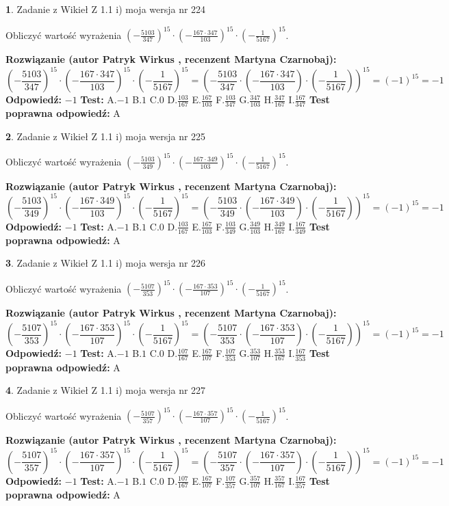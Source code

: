\documentclass[12pt, a4paper]{article}
\theoremstyle{definition} %
\newtheorem{zad}{}
\newcommand{\zadStart}[1]{\begin{zad}#1\newline}
\newcommand{\zadStop}{\end{zad}}
\newcommand{\rozwStart}[2]{\noindent \textbf{Rozwiązanie (autor #1 , recenzent #2): }\newline}
\newcommand{\rozwStop}{\newline}
\newcommand{\odpStart}{\noindent \textbf{Odpowiedź:}\newline}
\newcommand{\odpStop}{\newline}
\newcommand{\testStart}{\noindent \textbf{Test:}\newline}
\newcommand{\testStop}{\newline}
\newcommand{\kluczStart}{\noindent \textbf{Test poprawna odpowiedź:}\newline}
\newcommand{\kluczStop}{\newline}
\begin{document}
\zadStart{Zadanie z Wikieł Z 1.1 i) moja wersja nr 224}

Obliczyć wartość wyrażenia $(-\frac{5103}{347})^{15} \cdot (-\frac{167 \cdot 347}{103})^{15} \cdot (-\frac{1}{5167})^{15}$.
\zadStop
\rozwStart{Patryk Wirkus}{Martyna Czarnobaj}
$$(-\frac{5103}{347})^{15} \cdot (-\frac{167 \cdot 347}{103})^{15} \cdot (-\frac{1}{5167})^{15} = (-\frac{5103}{347} \cdot (-\frac{167 \cdot 347}{103}) \cdot (-\frac{1}{5167}))^{15} = (-1)^{15} = -1$$
\rozwStop
\odpStart
$-1$
\odpStop
\testStart
A.$-1$ B.$1$ C.$0$ D.$\frac{103}{167}$ E.$\frac{167}{103}$
F.$\frac{103}{347}$ G.$\frac{347}{103}$
H.$\frac{347}{167}$
I.$\frac{167}{347}$
\testStop
\kluczStart
A
\kluczStop



\zadStart{Zadanie z Wikieł Z 1.1 i) moja wersja nr 225}

Obliczyć wartość wyrażenia $(-\frac{5103}{349})^{15} \cdot (-\frac{167 \cdot 349}{103})^{15} \cdot (-\frac{1}{5167})^{15}$.
\zadStop
\rozwStart{Patryk Wirkus}{Martyna Czarnobaj}
$$(-\frac{5103}{349})^{15} \cdot (-\frac{167 \cdot 349}{103})^{15} \cdot (-\frac{1}{5167})^{15} = (-\frac{5103}{349} \cdot (-\frac{167 \cdot 349}{103}) \cdot (-\frac{1}{5167}))^{15} = (-1)^{15} = -1$$
\rozwStop
\odpStart
$-1$
\odpStop
\testStart
A.$-1$ B.$1$ C.$0$ D.$\frac{103}{167}$ E.$\frac{167}{103}$
F.$\frac{103}{349}$ G.$\frac{349}{103}$
H.$\frac{349}{167}$
I.$\frac{167}{349}$
\testStop
\kluczStart
A
\kluczStop



\zadStart{Zadanie z Wikieł Z 1.1 i) moja wersja nr 226}

Obliczyć wartość wyrażenia $(-\frac{5107}{353})^{15} \cdot (-\frac{167 \cdot 353}{107})^{15} \cdot (-\frac{1}{5167})^{15}$.
\zadStop
\rozwStart{Patryk Wirkus}{Martyna Czarnobaj}
$$(-\frac{5107}{353})^{15} \cdot (-\frac{167 \cdot 353}{107})^{15} \cdot (-\frac{1}{5167})^{15} = (-\frac{5107}{353} \cdot (-\frac{167 \cdot 353}{107}) \cdot (-\frac{1}{5167}))^{15} = (-1)^{15} = -1$$
\rozwStop
\odpStart
$-1$
\odpStop
\testStart
A.$-1$ B.$1$ C.$0$ D.$\frac{107}{167}$ E.$\frac{167}{107}$
F.$\frac{107}{353}$ G.$\frac{353}{107}$
H.$\frac{353}{167}$
I.$\frac{167}{353}$
\testStop
\kluczStart
A
\kluczStop



\zadStart{Zadanie z Wikieł Z 1.1 i) moja wersja nr 227}

Obliczyć wartość wyrażenia $(-\frac{5107}{357})^{15} \cdot (-\frac{167 \cdot 357}{107})^{15} \cdot (-\frac{1}{5167})^{15}$.
\zadStop
\rozwStart{Patryk Wirkus}{Martyna Czarnobaj}
$$(-\frac{5107}{357})^{15} \cdot (-\frac{167 \cdot 357}{107})^{15} \cdot (-\frac{1}{5167})^{15} = (-\frac{5107}{357} \cdot (-\frac{167 \cdot 357}{107}) \cdot (-\frac{1}{5167}))^{15} = (-1)^{15} = -1$$
\rozwStop
\odpStart
$-1$
\odpStop
\testStart
A.$-1$ B.$1$ C.$0$ D.$\frac{107}{167}$ E.$\frac{167}{107}$
F.$\frac{107}{357}$ G.$\frac{357}{107}$
H.$\frac{357}{167}$
I.$\frac{167}{357}$
\testStop
\kluczStart
A
\kluczStop
\end{document}
